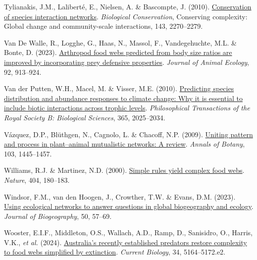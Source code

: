 \documentclass[
]{article}
\newlength{\cslhangindent}
\newenvironment{CSLReferences}[2] %
 {\begin{list}{}{%
  \setlength{\itemindent}{0pt}
  \setlength{\leftmargin}{0pt}
  \setlength{\parsep}{0pt}
  \ifodd #1
   \setlength{\leftmargin}{\cslhangindent}
   \setlength{\itemindent}{-1\cslhangindent}
  \fi
  \setlength{\itemsep}{#2\baselineskip}}}
 {\end{list}}
\begin{document}
\begin{CSLReferences}{1}{0}
Tylianakis, J.M., Laliberté, E., Nielsen, A. \& Bascompte, J. (2010).
\href{https://doi.org/10.1016/j.biocon.2009.12.004}{Conservation of
species interaction networks}. \emph{Biological Conservation},
Conserving complexity: {Global} change and community-scale interactions,
143, 2270--2279.

Van De Walle, R., Logghe, G., Haas, N., Massol, F., Vandegehuchte, M.L.
\& Bonte, D. (2023).
\href{https://doi.org/10.1111/1365-2656.13905}{Arthropod food webs
predicted from body size ratios are improved by incorporating prey
defensive properties}. \emph{Journal of Animal Ecology}, 92, 913--924.

Van der Putten, W.H., Macel, M. \& Visser, M.E. (2010).
\href{https://doi.org/10.1098/rstb.2010.0037}{Predicting species
distribution and abundance responses to climate change: Why it is
essential to include biotic interactions across trophic levels}.
\emph{Philosophical Transactions of the Royal Society B: Biological
Sciences}, 365, 2025--2034.

Vázquez, D.P., Blüthgen, N., Cagnolo, L. \& Chacoff, N.P. (2009).
\href{https://doi.org/10.1093/aob/mcp057}{Uniting pattern and process in
plant--animal mutualistic networks: A review}. \emph{Annals of Botany},
103, 1445--1457.

Williams, R.J. \& Martinez, N.D. (2000).
\href{https://doi.org/10.1038/35004572}{Simple rules yield complex food
webs}. \emph{Nature}, 404, 180--183.

Windsor, F.M., van den Hoogen, J., Crowther, T.W. \& Evans, D.M. (2023).
\href{https://doi.org/10.1111/jbi.14447}{Using ecological networks to
answer questions in global biogeography and ecology}. \emph{Journal of
Biogeography}, 50, 57--69.

Wooster, E.I.F., Middleton, O.S., Wallach, A.D., Ramp, D., Sanisidro,
O., Harris, V.K., \emph{et al.} (2024).
\href{https://doi.org/10.1016/j.cub.2024.09.049}{Australia's recently
established predators restore complexity to food webs simplified by
extinction}. \emph{Current Biology}, 34, 5164--5172.e2.


\end{CSLReferences}
\end{document}
